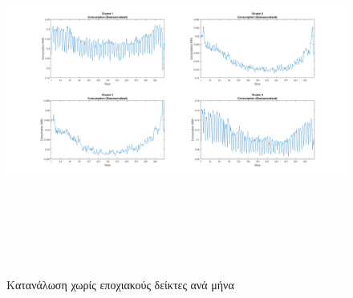 \documentclass[a4paper, 11pt]{article}
\begin{document}
\begin{figure}[ht!]
\centering
\includegraphics[width=180mm, height=120mm]{../../plots/Trend_estimation/Deseasonalized_month_ALL.png}
\caption{Κατανάλωση χωρίς εποχιακούς δείκτες ανά μήνα\label{deseasmonth}}
\end{figure}
\end{document}
